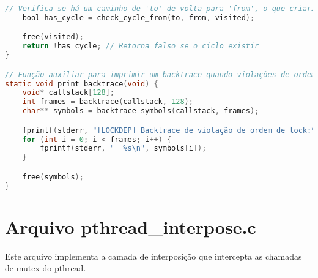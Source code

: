\begin{lstlisting}[language=C, caption={lockdep\_core.c - Implementação do sistema de detecção de deadlocks}]
    // Verifica se há um caminho de 'to' de volta para 'from', o que criaria um ciclo
    bool has_cycle = check_cycle_from(to, from, visited);

    free(visited);
    return !has_cycle; // Retorna falso se o ciclo existir
}

// Função auxiliar para imprimir um backtrace quando violações de ordem de lock são detectadas
static void print_backtrace(void) {
    void* callstack[128];
    int frames = backtrace(callstack, 128);
    char** symbols = backtrace_symbols(callstack, frames);

    fprintf(stderr, "[LOCKDEP] Backtrace de violação de ordem de lock:\n");
    for (int i = 0; i < frames; i++) {
        fprintf(stderr, "  %s\n", symbols[i]);
    }

    free(symbols);
}
\end{lstlisting}

\section{Arquivo pthread\_interpose.c}

Este arquivo implementa a camada de interposição que intercepta as chamadas de mutex do pthread.

